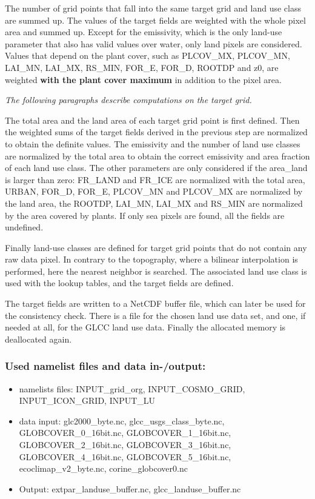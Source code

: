 \documentclass[a4paper,10pt,DIV14,BCOR1cm,titlepage,twoside]{scrartcl}
\begin{document}
\noindent The number of grid points that fall into the same target grid and land use class are summed up. The values of the target fields are weighted with the whole pixel area and summed up. Except for the emissivity, which is the only land-use parameter that also has valid values over water, only land pixels are considered. Values that depend on the plant cover, such as PLCOV\_MX, PLCOV\_MN, LAI\_MN, LAI\_MX, RS\_MIN, FOR\_E, FOR\_D, ROOTDP and z0, are weighted \textbf{with the plant cover maximum} in addition to the pixel area. \par\medskip\noindent
\textit{The following paragraphs describe computations on the target grid.}  \par\medskip\noindent
The total area and the land area of each target grid point is first defined. Then the weighted sums of the target fields derived in the previous step are normalized to obtain the definite values. The emissivity and the number of land use classes are normalized by the total area to obtain the correct emissivity and area fraction of each land use class. The other parameters are only considered if the area\_land is larger than zero: FR\_LAND and FR\_ICE are normalized with the total area, URBAN, FOR\_D, FOR\_E, PLCOV\_MN and PLCOV\_MX are normalized by the land area, the ROOTDP, LAI\_MN, LAI\_MX and RS\_MIN are normalized by the area covered by plants. If only sea pixels are found, all the fields are undefined.  \par\medskip\noindent
Finally land-use classes are defined for target grid points that do not contain any raw data pixel. In contrary to the topography, where a bilinear interpolation is performed, here the nearest neighbor is searched. The associated land use class is used with the lookup tables, and the target fields are defined.  \par\medskip\noindent
The target fields are written to a NetCDF buffer file, which can later be used for the consistency check. There is a file for the chosen land use data set, and one, if needed at all, for the GLCC land use data. Finally the allocated memory is deallocated again.  \par\medskip\noindent
\subsubsection{Used namelist files and data in-/output:}
\begin{itemize}
 \item namelists files: INPUT\_grid\_org, INPUT\_COSMO\_GRID, INPUT\_ICON\_GRID, INPUT\_LU 
 \item data input:  glc2000\_byte.nc, glcc\_usgs\_class\_byte.nc, GLOBCOVER\_0\_16bit.nc, GLOBCOVER\_1\_16bit.nc, GLOBCOVER\_2\_16bit.nc, GLOBCOVER\_3\_16bit.nc, GLOBCOVER\_4\_16bit.nc, GLOBCOVER\_5\_16bit.nc, ecoclimap\_v2\_byte.nc, corine\_globcover0.nc             
 \item Output: extpar\_landuse\_buffer.nc, glcc\_landuse\_buffer.nc
\end{itemize}
\end{document}
